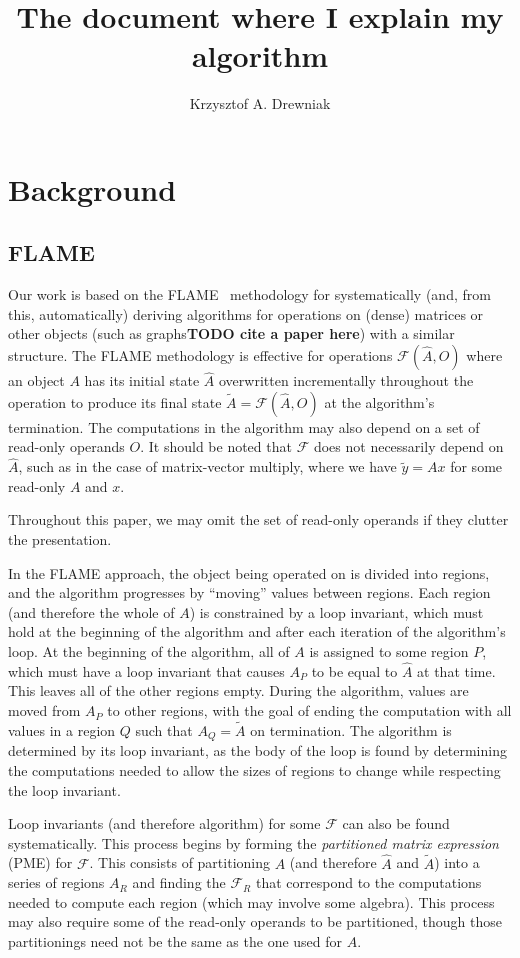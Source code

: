 \documentclass[12pt,letterpaper]{article}
\title{The document where I explain my algorithm}
\author{Krzysztof A. Drewniak}
\newcommand*{\mycite}[1]{~\cite{#1}}
\newcommand*{\opF}{\mathcal{F}}
\begin{document}
\maketitle{}
\section{Background}
\subsection{FLAME}
Our work is based on the FLAME\mycite{Bientinesi2005,Low2013} methodology for systematically (and, from this, automatically) deriving algorithms for operations on (dense) matrices or other objects (such as graphs\textbf{TODO cite a paper here}) with a similar structure.
The FLAME methodology is effective for operations $\opF(\hat{A}, O)$ where an object $A$ has its initial state $\hat{A}$ overwritten incrementally throughout the operation to produce its final state $\widetilde{A} = \opF(\hat{A}, O)$ at the algorithm's termination.
The computations in the algorithm may also depend on a set of read-only operands $O$.
It should be noted that $\opF$ does not necessarily depend on $\hat{A}$, such as in the case of matrix-vector multiply, where we have $\widetilde{y} = Ax$ for some read-only $A$ and $x$.

Throughout this paper, we may omit the set of read-only operands if they clutter the presentation.

In the FLAME approach, the object being operated on is divided into regions, and the algorithm progresses by ``moving'' values between regions.
Each region (and therefore the whole of $A$) is constrained by a loop invariant, which must hold at the beginning of the algorithm and after each iteration of the algorithm's loop.
At the beginning of the algorithm, all of $A$ is assigned to some region $P$, which must have a loop invariant that causes $A_P$ to be equal to $\hat{A}$ at that time.
This leaves all of the other regions empty.
During the algorithm, values are moved from $A_P$ to other regions, with the goal of ending the computation with all values in a region $Q$ such that $A_Q = \widetilde{A}$ on termination.
The algorithm is determined by its loop invariant, as the body of the loop is found by determining the computations needed to allow the sizes of regions to change while respecting the loop invariant.

Loop invariants (and therefore algorithm) for some $\opF$ can also be found systematically.
This process begins by forming the \emph{partitioned matrix expression} (PME) for $\opF$.
This consists of partitioning $A$ (and therefore $\hat{A}$ and $\widetilde{A}$) into a series of regions $A_R$ and finding the $\opF_R$ that correspond to the computations needed to compute each region (which may involve some algebra).
This process may also require some of the read-only operands to be partitioned, though those partitionings need not be the same as the one used for $A$.
\end{document}
